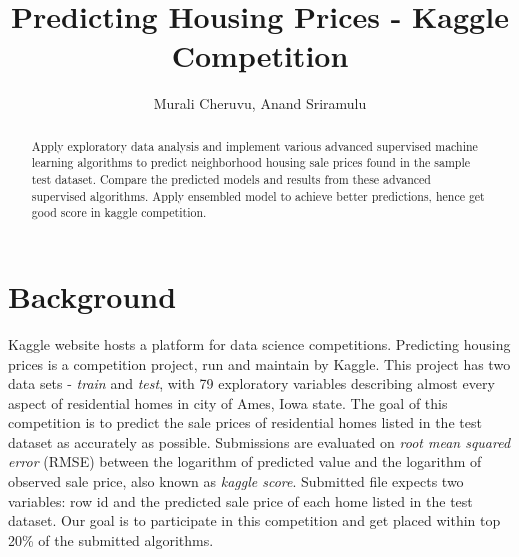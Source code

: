 \documentclass[sigconf]{acmart}
\begin{document}
		
	\title{Predicting Housing Prices - Kaggle Competition}	
	
	\author{Murali Cheruvu, Anand Sriramulu}
	
	\renewcommand{\shortauthors}{M. Cheruvu, A Sriramulu}
	
	
	\begin{abstract}
		
	Apply exploratory data analysis and implement various advanced supervised machine learning algorithms to predict neighborhood housing sale prices found in the sample test dataset. Compare the predicted models and results from these advanced supervised algorithms. Apply ensembled model to achieve better predictions, hence get good score in kaggle competition.
	
	\end{abstract}
	
	
	\maketitle
	
	\section{Background}
	
	Kaggle website hosts a platform for data science competitions. Predicting housing prices is a competition project, run and maintain by Kaggle. This project has two data sets - {\em train} and {\em test}, with 79 exploratory variables describing almost every aspect of residential homes in city of Ames, Iowa state. The goal of this competition is to predict the sale prices of residential homes listed in the test dataset as accurately as possible. Submissions are evaluated on {\em root mean squared error} (RMSE) between the logarithm of predicted value and the logarithm of observed sale price, also known as {\em kaggle score}. Submitted file expects two variables: row id and the predicted sale price of each home listed in the test dataset. Our goal is to participate in this competition and get placed within top 20\% of the submitted algorithms.
	
\end{document}
